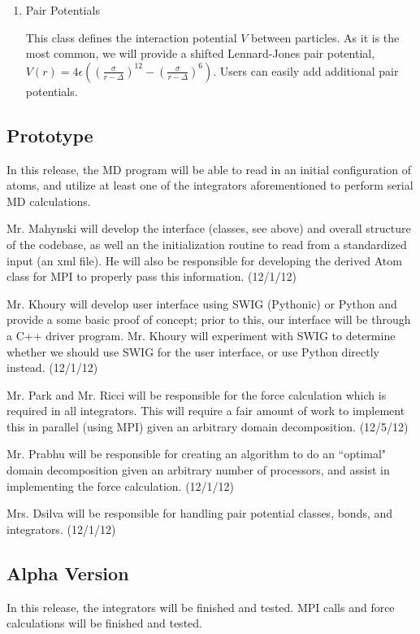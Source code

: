 \documentclass[10pt]{article}
\begin{document}
\begin{enumerate}
	\item{Pair Potentials} \par This class defines the interaction potential $V$ between particles. As it is the most common, we will provide a shifted Lennard-Jones pair potential, $V(r) = 4\epsilon \left( \left( \frac{\sigma}{r-\Delta} \right)^{12} - \left( \frac{\sigma}{r - \Delta} \right)^{6} \right)$. Users can easily add additional pair potentials.
\end{enumerate}

\subsection{Prototype}
In this release, the MD program will be able to read in an initial configuration of atoms, and utilize at least one of the integrators aforementioned to perform serial MD calculations.

Mr. Mahynski will develop the interface (classes, see above) and overall structure of the codebase, as well an the initialization routine to read from a standardized input (an xml file).  He will also be responsible for developing the derived Atom class for MPI to properly pass this information. (12/1/12)

Mr. Khoury will develop user interface using SWIG (Pythonic) or Python and provide a some basic proof of concept; prior to this, our interface will be through a C++ driver program. Mr. Khoury will experiment with SWIG to determine whether we should use SWIG for the user interface, or use Python directly instead. (12/1/12)

Mr. Park and Mr. Ricci will be responsible for the force calculation which is required in all integrators.  This will require a fair amount of work to implement this in parallel (using MPI) given an arbitrary domain decomposition. (12/5/12)

Mr. Prabhu will be responsible for creating an algorithm to do an ``optimal" domain decomposition given an arbitrary number of processors, and assist in implementing the force calculation.  (12/1/12)

Mrs. Dsilva will be responsible for handling pair potential classes, bonds, and integrators.  (12/1/12)

\subsection{Alpha Version}
In this release, the integrators will be finished and tested.  MPI calls and force calculations will be finished and tested.
\end{document}
